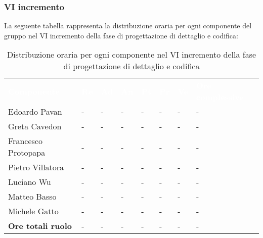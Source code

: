 \subsubsection{VI incremento}
La seguente tabella rappresenta la distribuzione oraria per ogni componente del gruppo nel VI incremento della fase di progettazione di dettaglio e codifica:
\begin{table}[!htbp]
\begin{center}
\renewcommand{\arraystretch}{1.25}
\begin{tabular}{ m{}<{\centering}  m{}<{\centering} m{}<{\centering} m{}<{\centering}  m{}<{\centering}  m{}<{\centering}  m{}<{\centering}  m{}<{\centering}   }
	\rowcolor{darkblue}
	\textcolor{white}{\textbf{Componente}} &\textcolor{white}{\textbf{Re}}&\textcolor{white}{\textbf{Ad}}&\textcolor{white}{\textbf{An}}&\textcolor{white}{\textbf{Pt}}&\textcolor{white}{\textbf{Pr}}&\textcolor{white}{\textbf{Ve}}&\textcolor{white}{\textbf{Ore complessive}}\\ 

	Edoardo Pavan & - & - & - & - & - & - & -\\	

	\rowcolor{gray!10} Greta Cavedon & - & - & - & - & - & - & -\\
	
	Francesco Protopapa & - & - & - & - & - & - & -\\
	
	\rowcolor{gray!10} Pietro Villatora & - & - & - & - & - & - & -\\
	
	Luciano Wu & - & - & - & - & - & - & -\\
	
	\rowcolor{gray!10} Matteo Basso & - & - & - & - & - & - & -\\
	
	Michele Gatto & - & - & - & - & - & - & -\\
	
	\rowcolor{gray!10} \textbf{Ore totali ruolo} & - & - & - & - & - & - & -\\

\end{tabular}
\caption{Distribuzione oraria per ogni componente nel VI incremento della fase di progettazione di dettaglio e codifica}
\end{center}
\end{table}

